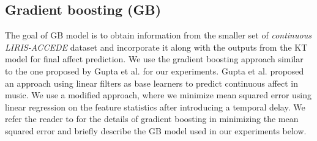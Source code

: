 \documentclass{article}
\begin{document}
\begin{spacing}{0.9}
\subsection{Gradient boosting (GB)}
\vspace{-2mm}


The goal of GB model is to obtain information from the smaller set of {\it continuous LIRIS-ACCEDE} dataset and incorporate it along with the outputs from the KT model for final affect prediction.
We use the gradient boosting approach similar to the one proposed by Gupta et al. \cite{gupta2015affect} for our experiments.
Gupta et al. \cite{gupta2015affect} proposed an approach using linear filters as base learners to predict continuous affect in music. 
We use a modified approach, where we minimize mean squared error using linear regression on the feature statistics after introducing a temporal delay.
We refer the reader to \cite{friedman2001greedy,gupta2015affect} for the details of gradient boosting in minimizing the mean squared error and briefly describe the GB model used in our experiments below. 


\end{spacing}
\end{document}
